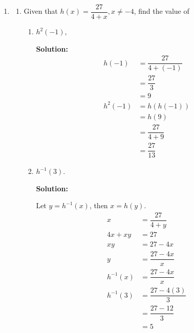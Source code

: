 \documentclass{report}
\newcommand{\sol}{\textbf{Solution:}}
\begin{document}
\begin{enumerate}[leftmargin=*]
    \item \begin{enumerate}
              \item Given that $h(x)=\dfrac{27}{4+x}, x \neq-4$, find the value of
                    \begin{enumerate}
                        \item $h^2(-1)$,

                              \sol{}
                              \begin{align*}
                                  h(-1)   & = \dfrac{27}{4+(-1)} \\
                                          & = \dfrac{27}{3}      \\
                                          & = 9                  \\
                                  h^2(-1) & = h(h(-1))           \\
                                          & = h(9)               \\
                                          & = \dfrac{27}{4+9}    \\
                                          & = \dfrac{27}{13}
                              \end{align*}

                        \item $h^{-1}(3)$.

                              \sol{}

                              Let $y = h^{-1}(x)$, then $x = h(y)$.
                              \begin{align*}
                                  x         & = \dfrac{27}{4+y}    \\
                                  4x+x y    & = 27                 \\
                                  x y       & = 27-4x              \\
                                  y         & = \dfrac{27-4x}{x}   \\
                                  h^{-1}(x) & = \dfrac{27-4x}{x}   \\
                                  h^{-1}(3) & = \dfrac{27-4(3)}{3} \\
                                            & = \dfrac{27-12}{3}   \\
                                            & = 5
                              \end{align*}
                    \end{enumerate}


\end{enumerate}
\end{enumerate}
\end{document}
